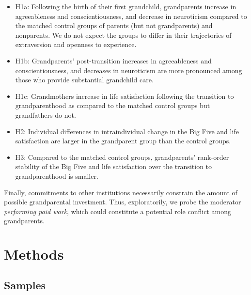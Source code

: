 \documentclass[
  english,
  man,floatsintext]{apa7}
\providecommand{\tightlist}{%
  \setlength{\itemsep}{0pt}\setlength{\parskip}{0pt}}
\begin{document}
\begin{itemize}
\tightlist
\item
  H1a: Following the birth of their first grandchild, grandparents increase in agreeableness and conscientiousness, and decrease in neuroticism compared to the matched control groups of parents (but not grandparents) and nonparents. We do not expect the groups to differ in their trajectories of extraversion and openness to experience.
\item
  H1b: Grandparents' post-transition increases in agreeableness and conscientiousness, and decreases in neuroticism are more pronounced among those who provide substantial grandchild care.
\item
  H1c: Grandmothers increase in life satisfaction following the transition to grandparenthood as compared to the matched control groups but grandfathers do not.
\item
  H2: Individual differences in intraindividual change in the Big Five and life satisfaction are larger in the grandparent group than the control groups.
\item
  H3: Compared to the matched control groups, grandparents' rank-order stability of the Big Five and life satisfaction over the transition to grandparenthood is smaller.
\end{itemize}

Finally, commitments to other institutions necessarily constrain the amount of possible grandparental investment. Thus, exploratorily, we probe the moderator \emph{performing paid work}, which could constitute a potential role conflict among grandparents.

\hypertarget{methods}{%
\section{Methods}\label{methods}}

\hypertarget{samples}{%
\subsection{Samples}\label{samples}}
\end{document}
